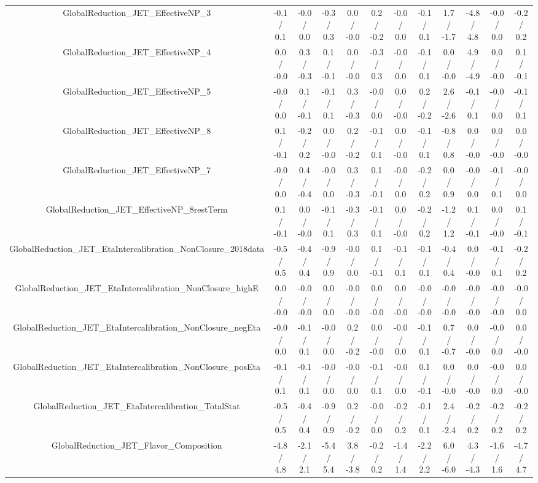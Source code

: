 \begin{table}[htbp]
\begin{center}
\begin{tabular}{|c|c|c|c|c|c|c|c|c|c|c|c|}
  GlobalReduction_JET_EffectiveNP_3 & -0.1 / 0.1 & -0.0 / 0.0 & -0.3 / 0.3 & 0.0 / -0.0 & 0.2 / -0.2 & -0.0 / 0.0 & -0.1 / 0.1 & 1.7 / -1.7 & -4.8 / 4.8 & -0.0 / 0.0 & -0.2 / 0.2 \\ 
  GlobalReduction_JET_EffectiveNP_4 & 0.0 / -0.0 & 0.3 / -0.3 & 0.1 / -0.1 & 0.0 / -0.0 & -0.3 / 0.3 & -0.0 / 0.0 & -0.1 / 0.1 & 0.0 / -0.0 & 4.9 / -4.9 & 0.0 / -0.0 & 0.1 / -0.1 \\ 
  GlobalReduction_JET_EffectiveNP_5 & -0.0 / 0.0 & 0.1 / -0.1 & -0.1 / 0.1 & 0.3 / -0.3 & -0.0 / 0.0 & 0.0 / -0.0 & 0.2 / -0.2 & 2.6 / -2.6 & -0.1 / 0.1 & -0.0 / 0.0 & -0.1 / 0.1 \\ 
  GlobalReduction_JET_EffectiveNP_8 & 0.1 / -0.1 & -0.2 / 0.2 & 0.0 / -0.0 & 0.2 / -0.2 & -0.1 / 0.1 & 0.0 / -0.0 & -0.1 / 0.1 & -0.8 / 0.8 & 0.0 / -0.0 & 0.0 / -0.0 & 0.0 / -0.0 \\ 
  GlobalReduction_JET_EffectiveNP_7 & -0.0 / 0.0 & 0.4 / -0.4 & -0.0 / 0.0 & 0.3 / -0.3 & 0.1 / -0.1 & -0.0 / 0.0 & -0.2 / 0.2 & 0.0 / 0.9 & -0.0 / 0.0 & -0.1 / 0.1 & -0.0 / 0.0 \\ 
  GlobalReduction_JET_EffectiveNP_8restTerm & 0.1 / -0.1 & 0.0 / -0.0 & -0.1 / 0.1 & -0.3 / 0.3 & -0.1 / 0.1 & 0.0 / -0.0 & -0.2 / 0.2 & -1.2 / 1.2 & 0.1 / -0.1 & 0.0 / -0.0 & 0.1 / -0.1 \\ 
  GlobalReduction_JET_EtaIntercalibration_NonClosure_2018data & -0.5 / 0.5 & -0.4 / 0.4 & -0.9 / 0.9 & -0.0 / 0.0 & 0.1 / -0.1 & -0.1 / 0.1 & -0.1 / 0.1 & -0.4 / 0.4 & 0.0 / -0.0 & -0.1 / 0.1 & -0.2 / 0.2 \\ 
  GlobalReduction_JET_EtaIntercalibration_NonClosure_highE & 0.0 / -0.0 & -0.0 / -0.0 & 0.0 / 0.0 & -0.0 / -0.0 & 0.0 / -0.0 & 0.0 / -0.0 & -0.0 / -0.0 & -0.0 / -0.0 & -0.0 / -0.0 & -0.0 / -0.0 & -0.0 / 0.0 \\ 
  GlobalReduction_JET_EtaIntercalibration_NonClosure_negEta & -0.0 / 0.0 & -0.1 / 0.1 & -0.0 / 0.0 & 0.2 / -0.2 & 0.0 / -0.0 & -0.0 / 0.0 & -0.1 / 0.1 & 0.7 / -0.7 & 0.0 / -0.0 & -0.0 / 0.0 & 0.0 / -0.0 \\ 
  GlobalReduction_JET_EtaIntercalibration_NonClosure_posEta & -0.1 / 0.1 & -0.1 / 0.1 & -0.0 / 0.0 & -0.0 / 0.0 & -0.1 / 0.1 & -0.0 / 0.0 & 0.1 / -0.1 & 0.0 / -0.0 & 0.0 / -0.0 & -0.0 / 0.0 & 0.0 / -0.0 \\ 
  GlobalReduction_JET_EtaIntercalibration_TotalStat & -0.5 / 0.5 & -0.4 / 0.4 & -0.9 / 0.9 & 0.2 / -0.2 & -0.0 / 0.0 & -0.2 / 0.2 & -0.1 / 0.1 & 2.4 / -2.4 & -0.2 / 0.2 & -0.2 / 0.2 & -0.2 / 0.2 \\ 
  GlobalReduction_JET_Flavor_Composition & -4.8 / 4.8 & -2.1 / 2.1 & -5.4 / 5.4 & 3.8 / -3.8 & -0.2 / 0.2 & -1.4 / 1.4 & -2.2 / 2.2 & 6.0 / -6.0 & 4.3 / -4.3 & -1.6 / 1.6 & -4.7 / 4.7 \\ 

\end{tabular}
\end{center}
\end{table}
